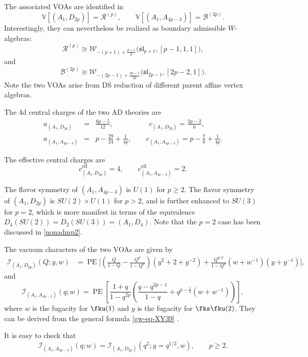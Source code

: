 \documentclass[a4paper,11pt]{article}
\theoremstyle{definition}
\theoremstyle{definition}
\theoremstyle{remark}
\newcommand{\ceff}{c^\text{eff}}
\newcommand{\be}{\begin{equation}}
\newcommand{\ee}{\end{equation}}
\newcommand{\beqn}{\begin{eqnarray}}
\newcommand{\eeqn}{\end{eqnarray}}
\begin{document}
 


The associated VOAs are identified in    \cite{Creutzig:2017qyf,Adamovic:2020lvj}
\be 
\mathbb V[(A_1,D_{2p})]=\mathcal R^{(p)},
\qquad
\mathbb V[(A_1,A_{4p-3})]=\mathcal B^{(2p)}.
\ee
Interestingly, they can nevertheless be realized as boundary admissible $W$-algebras: 
\be 
\mathcal R^{(p)}
\cong 
\mathcal W_{-(p+1)+\frac{p+1}{p}}
\bigl(\mathfrak{sl}_{p+1},[p-1,1,1]\bigr),
\ee
and
\be 
\mathcal B^{(2p)}
\cong
\mathcal W_{-(2p-1)+\frac{ 2p-1 }{2p}}
\bigl(\mathfrak{sl}_{2p-1},[2p-2,1]\bigr).
\ee
Note the two VOAs arise from   DS reduction of different parent affine vertex algebras. 

The 4d central charges of the two AD theories are 
\beqn
a_{(A_1,D_{2p})}&=&\frac{6p-5}{12},\qquad\qquad\quad
c_{(A_1,D_{2p})}=\frac{3p-2}{6}, \\
a_{(A_1,A_{4p-3})}&=&p-\frac{29}{24}+\frac{1}{4p},\qquad
c_{(A_1,A_{4p-3})}=p-\frac76+\frac{1}{4p}.
\eeqn
 
 
The effective central charges are 
\be\label{ceffAD}
\ceff_{(A_1, D_{2p})} =4, \qquad  \ceff_{(A_1, A_{4p-3})}=2.
\ee

 
 
 
The flavor symmetry of  $(A_1, A_{4p-3})$ is $U(1)$ for $p\ge 2$. 
The flavor symmetry of $(A_1, D_{2p})$ is $SU(2)\times U(1)$ for $p>2$, and is further enhanced to $SU(3)$ for $p=2$, which is more manifest in terms of the equivalence $D_4(SU(2))=D_2(SU(3))=(A_1,D_4)$.
Note that the $p=2$ case has been  discussed in \eqref{nonadmp2}. 

 The vacuum characters of the two VOAs are given by  %
  \be
\begin{aligned}
\mathcal I_{(A_1,D_{2p})}(Q;y,w)
&=\operatorname{PE}\Biggl[
\left(\frac{Q}{1-Q}-\frac{Q^p}{1-Q^p}\right)(y^2+2+y^{-2}) 
 +\frac{Q^{p/2}}{1-Q^p}(w+w^{-1})(y+y^{-1})\Biggr],
\end{aligned}
\ee 
%
 and
   \be\label{AAfsdfs}
\mathcal I_{(A_1,A_{4p-3})}(q;w)
=
\operatorname{PE}\left[
\frac{1+q}{1-q^{2p}}
\left(
\frac{q-q^{2p-1}}{1-q}
+q^{p-\frac12}(w+w^{-1})
\right)
\right],
\ee 
where $w$ is the fugacity for $ \fku(1)$ and $y$ is the  fugacity for $\fks\fku(2)$. They can be derived from the general formula \eqref{gw-eq-XY39} \cite{Xie:2019zlb}. 

It is easy to check that 
  \be\label{AAfDdfs}
\mathcal I_{(A_1,A_{4p-3})}(q;w)
=
\mathcal I_{(A_1,D_{2p})}
\left(q^2;y=q^{1/2},w\right) ,
\qquad p\ge2.
\ee 
\end{document}
